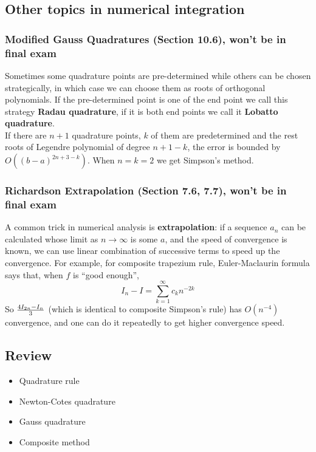 \documentclass[20pt]{article} %
\theoremstyle{break}
\begin{document}
\newpage

\subsection{Other topics in numerical integration}

\subsubsection{Modified Gauss Quadratures (Section 10.6), won't be in final exam}

Sometimes some quadrature points are pre-determined while others can be chosen strategically, in which case we can choose them as roots of orthogonal polynomials. If the pre-determined point is one of the end point we call this strategy {\bf Radau quadrature}, if it is both end points we call it {\bf Lobatto quadrature}.\\

If there are $n+1$ quadrature points, $k$ of them are predetermined and the rest roots of Legendre polynomial of degree $n+1-k$, the error is bounded by $O((b-a)^{2n+3-k})$. When $n=k=2$ we get Simpson's method.\\

\newpage

\subsubsection{Richardson Extrapolation (Section 7.6, 7.7), won't be in final exam}

A common trick in numerical analysis is {\bf extrapolation}: if a sequence $a_n$ can be calculated whose limit as $n\rightarrow \infty$ is some $a$, and the speed of convergence is known, we can use linear combination of successive terms to speed up the convergence. For example, for composite trapezium rule, Euler-Maclaurin formula says that, when $f$ is ``good enough'', 
\[I_n-I=\sum_{k=1}^\infty c_kn^{-2k}\]
So ${4I_{2n}-I_n\over 3}$ (which is identical to composite Simpson's rule) has $O(n^{-4})$ convergence, and one can do it repeatedly to get higher convergence speed.

\subsection{Review}

\begin{itemize}
\item Quadrature rule
\item Newton-Cotes quadrature
\item Gauss quadrature
\item Composite method
\end{itemize}
\end{document}
